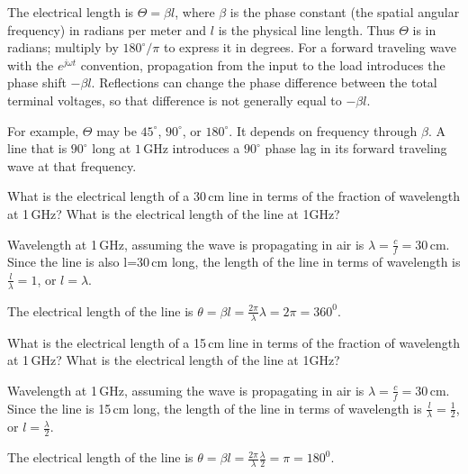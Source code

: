 \documentclass{ximera}
\begin{document}
The electrical length is $\Theta=\beta l$, where $\beta$ is the phase constant (the spatial angular frequency) in radians per meter and $l$ is the physical line length. Thus $\Theta$ is in radians; multiply by $180^\circ/\pi$ to express it in degrees. For a forward traveling wave with the $e^{j\omega t}$ convention, propagation from the input to the load introduces the phase shift $-\beta l$. Reflections can change the phase difference between the total terminal voltages, so that difference is not generally equal to $-\beta l$.

For example, $\Theta$ may be $45^\circ$, $90^\circ$, or $180^\circ$. It depends on frequency through $\beta$. A line that is $90^\circ$ long at $1\,\mathrm{GHz}$ introduces a $90^\circ$ phase lag in its forward traveling wave at that frequency.


\begin{example}
What is the electrical length of a 30\,cm line in terms of the fraction of wavelength at 1\,GHz? What is the electrical length of the line at 1GHz?
\begin{explanation}
Wavelength at 1\,GHz, assuming the wave is propagating in air is $\lambda=\frac{c}{f}=30$\,cm. Since the line is also l=30\,cm long, the length of the line in terms of wavelength is $\frac{l}{\lambda}=1$, or $l=\lambda$.

The electrical length of the line is $\theta=\beta l = \frac{2 \pi}{\lambda} \lambda= 2 \pi = 360^0$.

\end{explanation}

\end{example}


\begin{example}
What is the electrical length of a 15\,cm line in terms of the fraction of wavelength at 1\,GHz? What is the electrical length of the line at 1GHz?
\begin{explanation}
Wavelength at 1\,GHz, assuming the wave is propagating in air is $\lambda=\frac{c}{f}=30$\,cm. Since the line is 15\,cm long, the length of the line in terms of wavelength is $\frac{l}{\lambda}=\frac{1}{2}$, or $l=\frac{\lambda}{2}$.

The electrical length of the line is $\theta=\beta l = \frac{2 \pi}{\lambda} \frac{\lambda}{2} =  \pi = 180^0$.


\end{explanation}

\end{example}
\end{document}
